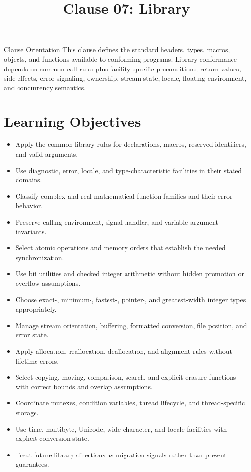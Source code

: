\documentclass[10pt,letterpaper]{article}
\title{Clause 07: Library}
\author{}
\date{}
\begin{document}
\maketitle



\begin{CornellOverviewBox}{Clause Orientation}
This clause defines the standard headers, types, macros, objects, and functions available to conforming programs. Library conformance depends on common call rules plus facility-specific preconditions, return values, side effects, error signaling, ownership, stream state, locale, floating environment, and concurrency semantics.
\end{CornellOverviewBox}

\section{Learning Objectives}
\begin{itemize}
  \item Apply the common library rules for declarations, macros, reserved identifiers, and valid arguments.
  \item Use diagnostic, error, locale, and type-characteristic facilities in their stated domains.
  \item Classify complex and real mathematical function families and their error behavior.
  \item Preserve calling-environment, signal-handler, and variable-argument invariants.
  \item Select atomic operations and memory orders that establish the needed synchronization.
  \item Use bit utilities and checked integer arithmetic without hidden promotion or overflow assumptions.
  \item Choose exact-, minimum-, fastest-, pointer-, and greatest-width integer types appropriately.
  \item Manage stream orientation, buffering, formatted conversion, file position, and error state.
  \item Apply allocation, reallocation, deallocation, and alignment rules without lifetime errors.
  \item Select copying, moving, comparison, search, and explicit-erasure functions with correct bounds and overlap assumptions.
  \item Coordinate mutexes, condition variables, thread lifecycle, and thread-specific storage.
  \item Use time, multibyte, Unicode, wide-character, and locale facilities with explicit conversion state.
  \item Treat future library directions as migration signals rather than present guarantees.
\end{itemize}
\end{document}
